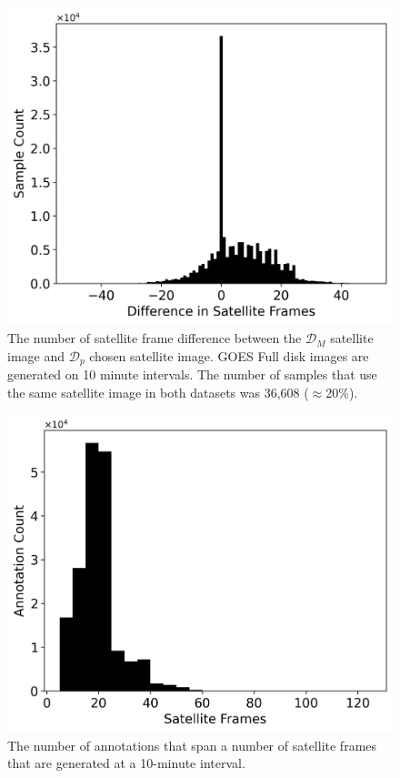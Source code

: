 \documentclass{article}
\begin{document}
\begin{figure}[!htb]
    \centering
    \includegraphics[width=\linewidth]{stat_figs/sample_count_vs_diff_frames.png}
    \caption{The number of satellite frame difference between the \(\mathcal{D}_M\) satellite image and \(\mathcal{D}_p\) chosen satellite image. GOES Full disk images are generated on 10 minute intervals. The number of samples that use the same satellite image in both datasets was 36,608 (\(\approx\)20\%).}\label{all_bands}
\end{figure}


\begin{figure}[!htb]
    \centering
    \includegraphics[width=\linewidth]{stat_figs/sample_count_vs_frames.png}
    \caption{The number of annotations that span a number of satellite frames that are generated at a 10-minute interval.}\label{all_bands}
\end{figure}
\end{document}

